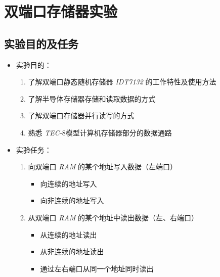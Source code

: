 \section{双端口存储器实验}
    \subsection{实验目的及任务}
        \begin{itemize}
            \item 实验目的：
            \begin{enumerate}
                \item 了解双端口静态随机存储器 \textit{IDT7132} 的工作特性及使用方法
                \item 了解半导体存储器存储和读取数据的方式
                \item 了解双端口存储器并行读写的方式
                \item 熟悉 \textit{TEC-}8模型计算机存储器部分的数据通路
            \end{enumerate}
            \item 实验任务：
            \begin{enumerate}
                \item 向双端口 \textit{RAM} 的某个地址写入数据（左端口）
                \begin{itemize}
                    \item 向连续的地址写入
                    \item 向非连续的地址写入
                \end{itemize}
                \item 从双端口 \textit{RAM} 的某个地址中读出数据（左、右端口）
                \begin{itemize}
                    \item 从连续的地址读出
                    \item 从非连续的地址读出
                    \item 通过左右端口从同一个地址同时读出
                \end{itemize}
            \end{enumerate}
        \end{itemize}
    
